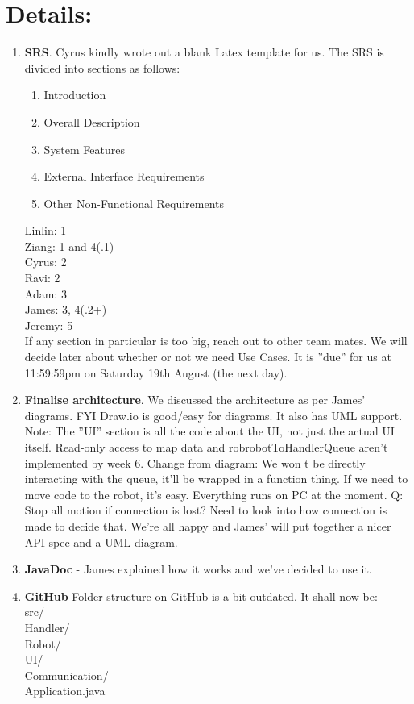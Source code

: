 \documentclass{article}
\begin{document}
\section{Details:}
\begin{enumerate}
\item \textbf{SRS}. Cyrus kindly wrote out a blank Latex template for us. The SRS is divided into sections as follows:
\renewcommand{\labelenumii}{\arabic{enumii}.}
\begin{enumerate}
\item Introduction
\item Overall Description
\item System Features
\item External Interface Requirements
\item Other Non-Functional Requirements
\end{enumerate}

Linlin: 1\\
Ziang: 1 and 4(.1)\\
Cyrus: 2\\
Ravi: 2\\
Adam: 3\\
James: 3, 4(.2+)\\
Jeremy: 5\\
If any section in particular is too big, reach out to other team mates. We will decide later about whether or not we need Use Cases. It is ''due'' for us at 11:59:59pm on Saturday 19th August (the next day).

\item \textbf{Finalise architecture}. We discussed the architecture as per James' diagrams. FYI Draw.io is good/easy for diagrams. It also has UML support. Note: The ''UI'' section is all the code about the UI, not just the actual UI itself. Read-only access to map data and robrobotToHandlerQueue aren’t implemented by week 6. Change from diagram: We won
t be directly interacting with the queue, it'll be wrapped in a function thing. If we need to move code to the robot, it’s easy. Everything runs on PC at the moment. Q: Stop all motion if connection is lost? Need to look into how connection is made to decide that. We're all happy and James' will put together a nicer API spec and a UML diagram.

\item \textbf{JavaDoc} - James explained how it works and we've decided to use it.

\item \textbf{GitHub} Folder structure on GitHub is a bit outdated. It shall now be: \\
src/\\
\hspace{.75cm}Handler/\\\hspace{.75cm}Robot/\\\hspace{.75cm}UI/\\\hspace{.75cm}Communication/\\\hspace{.75cm}Application.java\\


\end{enumerate}
\end{document}
